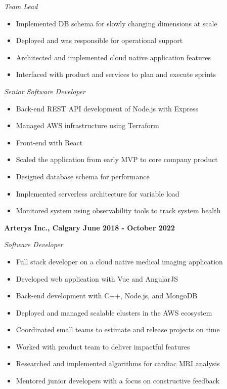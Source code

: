 \documentclass[12pt]{article}
\begin{document}
\indent \emph{ Team Lead }
\begin{itemize}
  \item Implemented DB schema for slowly changing dimensions at scale
  \item Deployed and was responsible for operational support
  \item Architected and implemented cloud native application features
  \item Interfaced with product and services to plan and execute sprints
\end{itemize}

\indent \emph{ Senior Software Developer }
\begin{itemize}
  \item Back-end REST API development of Node.js with Express
  \item Managed AWS infrastructure using Terraform
  \item Front-end with React
  \item Scaled the application from early MVP to core company product
  \item Designed database schema for performance
  \item Implemented serverless architecture for variable load
  \item Monitored system using observability tools to track system health
\end{itemize}
\medskip

\pagebreak
\noindent \centerline{ \bf Arterys Inc., Calgary \hfill June 2018 - October 2022}
\indent \emph{ Software Developer }
\begin{itemize}
  \item Full stack developer on a cloud native medical imaging application
  \item Developed web application with Vue and AngularJS
  \item Back-end development with C++, Node.js, and MongoDB
  \item Deployed and managed scalable clusters in the AWS ecosystem
  \item Coordinated small teams to estimate and release projects on time
  \item Worked with product team to deliver impactful features
  \item Researched and implemented algorithms for cardiac MRI analysis
  \item Mentored junior developers with a focus on constructive feedback
\end{itemize}
\medskip
\end{document}
